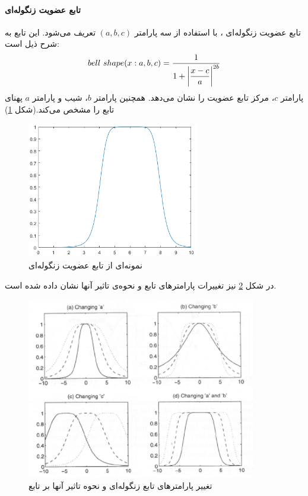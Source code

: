 \paragraph{تابع عضویت زنگوله‌ای}
تابع عضویت زنگوله‌ای
،
با استفاده از سه پارامتر $(a, b, c)$ تعریف می‌شود. این تابع به شرح ذیل است:
\begin{equation}\label{eq:e_fset_memfunc_bellshape}
bell\ shape (x: a, b, c) = \frac{1}{1+ \mathlarger{ \left| \frac{x-c}{a}\right| ^{2b}} }
\end{equation}
پارامتر $c$، مرکز تابع عضویت را نشان می‌دهد. همچنین پارامتر $b$، شیب و پارامتر $a$ پهنای تابع را مشخص می‌کند.(شکل \ref{fig:f_17})
 \\
\begin{figure}[h]
	\centering 
	\includegraphics[width=75mm]{Images/Fig17.png}
	\vspace{-0.5cm}
	\caption{نمونه‌ای از تابع عضویت زنگوله‌ای}\label{fig:f_17}
\end{figure}
در شکل 
\ref{fig:f_20}
نیز تغییرات پارامترهای تابع و نحوه‌ی تاثیر آنها نشان داده شده است. 
\cite{yen1999fuzzy}
\begin{figure}[!htbp]
	\centering 
	\includegraphics[width=100mm]{Images/Fig20.png}
	\vspace{-0.5cm}
	\caption{تغییر پارامترهای تابع زنگوله‌ای و نحوه تاثیر آنها بر تابع}\label{fig:f_20}
\end{figure}
